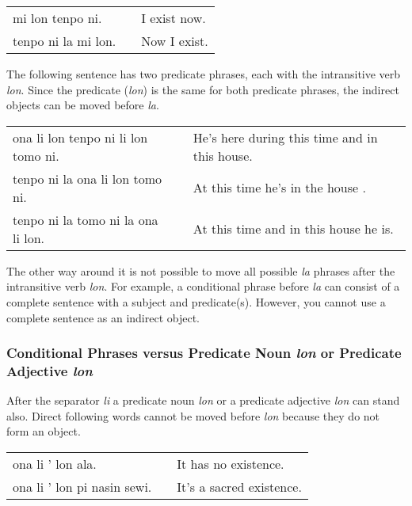 \begin{supertabular}{p{5,5cm}|ll}
mi lon tenpo ni. && I exist now. \\
tenpo ni la mi lon. && Now I exist. \\
\end{supertabular}

The following sentence has two predicate phrases, each with the intransitive verb \textit{lon}. 
Since the predicate (\textit{lon}) is the same for both predicate phrases, the indirect objects can be moved before \textit{la}. 

\begin{supertabular}{p{5,5cm}|ll}
ona li lon tenpo ni li lon tomo ni. && He's here during this time and in this house. \\
tenpo ni la ona li lon tomo ni.     && At this time he's in the house . \\  
tenpo ni la tomo ni la ona li lon.  && At this time and in this house he is. \\  
\end{supertabular}

The other way around it is not possible to move all possible \textit{la} phrases after the intransitive verb \textit{lon}. 
For example, a conditional phrase before \textit{la} can consist of a complete sentence with a subject and predicate(s). 
However, you cannot use a complete sentence as an indirect object.

%
%
\subsubsection*{Conditional Phrases versus Predicate Noun \textit{lon} or Predicate Adjective \textit{lon} }
%
%

After the separator \textit{li} a predicate noun \textit{lon} or a predicate adjective \textit{lon} can stand also. 
Direct following words cannot be moved before \textit{lon} because they do not form an object. 

\begin{supertabular}{p{5,5cm}|ll}
ona li ' lon ala. &&  It has no existence. \\
ona li ' lon pi nasin sewi. && It's a sacred existence. \\
\end{supertabular}

%
%
